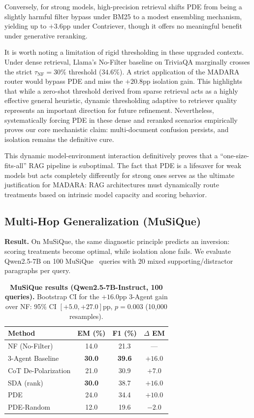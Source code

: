 \documentclass[11pt]{article}
\theoremstyle{definition}
\begin{document}
Conversely, for strong models, high-precision retrieval shifts PDE from being a slightly harmful filter bypass under BM25 to a modest ensembling mechanism, yielding up to \(+3.6\)pp under Contriever, though it offers no meaningful benefit under generative reranking. 

It is worth noting a limitation of rigid thresholding in these upgraded contexts. Under dense retrieval, Llama's No-Filter baseline on TriviaQA marginally crosses the strict \(\tau_{\text{NF}}=30\%\) threshold (\(34.6\%\)). A strict application of the MADARA router would bypass PDE and miss the \(+20.8\)pp isolation gain. This highlights that while a zero-shot threshold derived from sparse retrieval acts as a highly effective general heuristic, dynamic thresholding adaptive to retriever quality represents an important direction for future refinement. Nevertheless, systematically forcing PDE in these dense and reranked scenarios empirically proves our core mechanistic claim: multi-document confusion persists, and isolation remains the definitive cure.

This dynamic model-environment interaction definitively proves that a ``one-size-fits-all'' RAG pipeline is suboptimal. The fact that PDE is a lifesaver for weak models but acts completely differently for strong ones serves as the ultimate justification for MADARA: RAG architectures must dynamically route treatments based on intrinsic model capacity and scoring behavior.


\subsection{Multi-Hop Generalization (MuSiQue)}
\label{subsec:musique}

\textbf{Result.} On MuSiQue, the same diagnostic principle predicts an inversion: scoring treatments become optimal, while isolation alone fails. We evaluate Qwen2.5-7B on 100 MuSiQue~\citep{trivedi2022musique} queries with 20 mixed supporting/distractor paragraphs per query.

\begin{table}[ht]
\centering
\small
\setlength{\tabcolsep}{4pt}
\begin{tabular}{@{}lccc@{}}
\toprule
\textbf{Method} & \textbf{EM (\%)} & \textbf{F1 (\%)} & \textbf{\(\Delta\) EM} \\
\midrule
NF (No-Filter)        & 14.0 & 21.3 & --- \\
3-Agent Baseline      & \textbf{30.0} & \textbf{39.6} & \(+16.0\) \\
CoT De-Polarization   & 21.0 & 30.9 & \(+7.0\) \\
SDA (rank)            & \textbf{30.0} & 38.7 & \(+16.0\) \\
PDE                   & 24.0 & 34.4 & \(+10.0\) \\
PDE-Random            & 12.0 & 19.6 & \(-2.0\) \\
\bottomrule
\end{tabular}
\caption{\textbf{MuSiQue results (Qwen2.5-7B-Instruct, 100 queries).} Bootstrap CI for the \(+16.0\)pp 3-Agent gain over NF: 95\% CI \([+5.0, +27.0]\)pp, \(p=0.003\) (10{,}000 resamples).}
\label{tab:musique-results}
\end{table}
\end{document}
